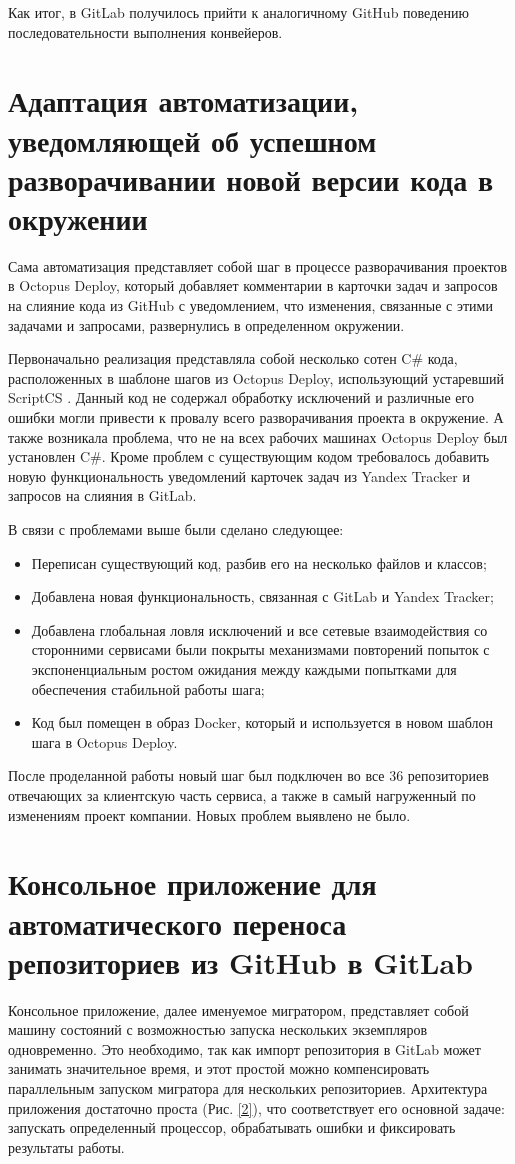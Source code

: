 Как итог, в GitLab получилось прийти к аналогичному GitHub поведению последовательности выполнения конвейеров.


\section{Адаптация автоматизации, уведомляющей об успешном разворачивании новой версии кода в окружении}
Сама автоматизация представляет собой шаг в процессе разворачивания проектов в Octopus Deploy, который добавляет комментарии в карточки задач и запросов на слияние кода из GitHub с уведомлением, что изменения, связанные с этими задачами и запросами, развернулись в определенном окружении.

Первоначально реализация представляла собой несколько сотен C\# кода, расположенных в шаблоне шагов из Octopus Deploy, использующий устаревший ScriptCS \cite{scriptcs}. Данный код не содержал обработку исключений и различные его ошибки могли привести к провалу всего разворачивания проекта в окружение. А также возникала проблема, что не на всех рабочих машинах Octopus Deploy был установлен C\#. Кроме проблем с существующим кодом требовалось добавить новую функциональность уведомлений карточек задач из Yandex Tracker \cite{yandextracker} и запросов на слияния в GitLab.

В связи с проблемами выше были сделано следующее:
\begin{itemize}
  \item Переписан существующий код, разбив его на несколько файлов и классов;
  \item Добавлена новая функциональность, связанная с GitLab и Yandex Tracker;
  \item Добавлена глобальная ловля исключений и все сетевые взаимодействия со сторонними сервисами были покрыты механизмами повторений попыток с экспоненциальным ростом ожидания между каждыми попытками для обеспечения стабильной работы шага;
  \item Код был помещен в образ Docker, который и используется в новом шаблон шага в Octopus Deploy.
\end{itemize}

После проделанной работы новый шаг был подключен во все 36 репозиториев отвечающих за клиентскую часть сервиса, а также в самый нагруженный по изменениям проект компании. Новых проблем выявлено не было.

\section{Консольное приложение для автоматического переноса репозиториев из GitHub в GitLab}
Консольное приложение, далее именуемое мигратором, представляет собой машину состояний с возможностью запуска нескольких экземпляров одновременно. Это необходимо, так как импорт репозитория в GitLab может занимать значительное время, и этот простой можно компенсировать параллельным запуском мигратора для нескольких репозиториев. Архитектура приложения достаточно проста (Рис. \ref{2}), что соответствует его основной задаче: запускать определенный процессор, обрабатывать ошибки и фиксировать результаты работы.

